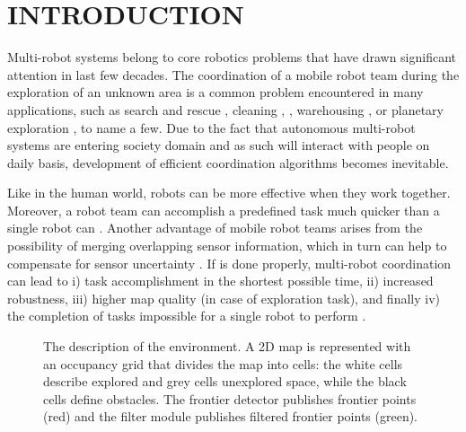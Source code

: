 \section{INTRODUCTION}
Multi-robot systems belong to core robotics problems that have drawn significant attention in last few decades. The coordination of a mobile robot team during the exploration of an unknown area is a common problem encountered in many applications, such as search and rescue \cite{Murphy2004}, cleaning \cite{Endres}, \cite{Pinheiro2015}, warehousing \cite{Wurman2008}, or planetary exploration \cite{Mataric2001}, to name a few. Due to the fact that autonomous multi-robot systems are entering society domain and as such will interact with people on daily basis, development of efficient coordination algorithms becomes inevitable.

 Like in the human world, robots can be more effective when they work together. Moreover, a robot team can accomplish a predefined task much quicker than a single robot can \cite{Dias2000}. Another advantage of mobile robot teams arises from the possibility of merging overlapping sensor information, which in turn can help to compensate for sensor uncertainty \cite{Wurm2008}.
If is done properly, multi-robot coordination can lead to i) task accomplishment in the shortest possible time, ii) increased robustness, iii) higher map quality (in case of exploration task), and finally iv) the completion of tasks impossible for a single robot to perform \cite{Dias2006}.

\begin{figure}[t!]
    \centering
	\caption {The description of the environment. A 2D map is represented with an occupancy grid that divides the map into cells: the white cells describe explored and grey cells unexplored space, while the black cells define obstacles. The frontier detector publishes frontier points (red) and the filter module publishes filtered frontier points (green).}
	\label{fig:environment}
\end{figure}


